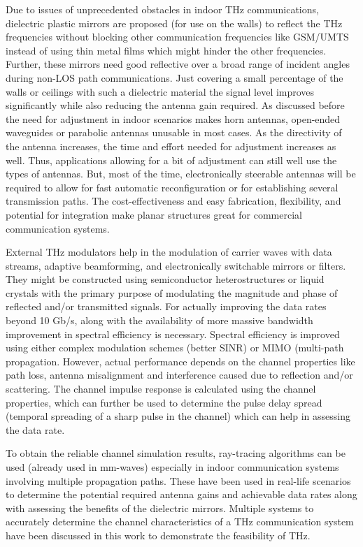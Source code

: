 \documentclass[12pt, letterpaper]{article}
\begin{document}
\par
Due to issues of unprecedented obstacles in indoor THz communications, dielectric plastic mirrors are proposed (for use on the walls) to reflect the THz frequencies without blocking other communication frequencies like GSM/UMTS instead of using thin metal films which might hinder the other frequencies. Further, these mirrors need good reflective over a broad range of incident angles during non-LOS path communications. Just covering a small percentage of the walls or ceilings with such a dielectric material the signal level improves significantly while also reducing the antenna gain required. As discussed before the need for adjustment in indoor scenarios makes horn antennas, open-ended waveguides or parabolic antennas unusable in most cases. As the directivity of the antenna increases, the time and effort needed for adjustment increases as well. Thus, applications allowing for a bit of adjustment can still well use the types of antennas. But, most of the time, electronically steerable antennas will be required to allow for fast automatic reconfiguration or for establishing several transmission paths. The cost-effectiveness and easy fabrication, flexibility, and potential for integration make planar structures great for commercial communication systems.
\par
External THz modulators help in the modulation of carrier waves with data streams, adaptive beamforming, and electronically switchable mirrors or filters. They might be constructed using semiconductor heterostructures or liquid crystals with the primary purpose of modulating the magnitude and phase of reflected and/or transmitted signals. For actually improving the data rates beyond 10 Gb/s, along with the availability of more massive bandwidth improvement in spectral efficiency is necessary. Spectral efficiency is improved using either complex modulation schemes (better SINR) or MIMO (multi-path propagation. However, actual performance depends on the channel properties like path loss, antenna misalignment and interference caused due to reflection and/or scattering. The channel impulse response is calculated using the channel properties, which can further be used to determine the pulse delay spread (temporal spreading of a sharp pulse in the channel) which can help in assessing the data rate. 
\par
To obtain the reliable channel simulation results, ray-tracing algorithms can be used (already used in mm-waves) especially in indoor communication systems involving multiple propagation paths. These have been used in real-life scenarios to determine the potential required antenna gains and achievable data rates along with assessing the benefits of the dielectric mirrors. Multiple systems to accurately determine the channel characteristics of a THz communication system have been discussed in this work to demonstrate the feasibility of THz.
\end{document}
